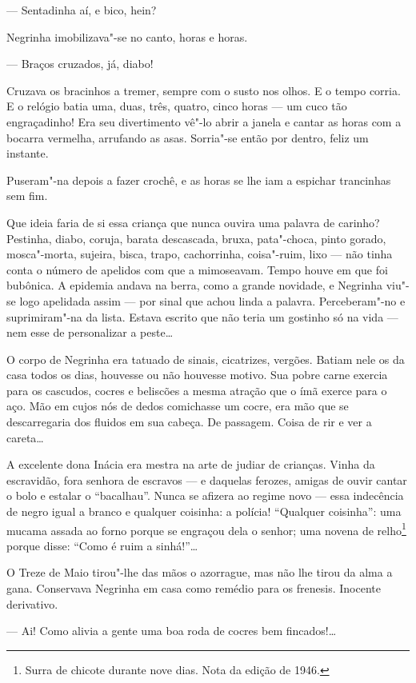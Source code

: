 --- Sentadinha aí, e bico, hein?

Negrinha imobilizava"-se no canto, horas e horas.

--- Braços cruzados, já, diabo!

Cruzava os bracinhos a tremer, sempre com o susto nos olhos. E o tempo
corria. E o relógio batia uma, duas, três, quatro, cinco horas --- um
cuco tão engraçadinho! Era seu divertimento vê"-lo abrir a janela e
cantar as horas com a bocarra vermelha, arrufando as asas. Sorria"-se
então por dentro, feliz um instante.

Puseram"-na depois a fazer crochê, e as horas se lhe iam a espichar
trancinhas sem fim.

Que ideia faria de si essa criança que nunca ouvira uma palavra de
carinho? Pestinha, diabo, coruja, barata descascada, bruxa, pata"-choca,
pinto gorado, mosca"-morta, sujeira, bisca, trapo, cachorrinha,
coisa"-ruim, lixo --- não tinha conta o número de apelidos com que a
mimoseavam. Tempo houve em que foi bubônica. A epidemia andava na berra,
como a grande novidade, e Negrinha viu"-se logo apelidada assim --- por
sinal que achou linda a palavra. Perceberam"-no e suprimiram"-na da lista.
Estava escrito que não teria um gostinho só na vida --- nem esse de
personalizar a peste\ldots{}

O corpo de Negrinha era tatuado de sinais, cicatrizes, vergões. Batiam
nele os da casa todos os dias, houvesse ou não houvesse motivo. Sua
pobre carne exercia para os cascudos, cocres e beliscões a mesma atração
que o ímã exerce para o aço. Mão em cujos nós de dedos comichasse um
cocre, era mão que se descarregaria dos fluidos em sua cabeça. De
passagem. Coisa de rir e ver a careta\ldots{}

A excelente dona Inácia era mestra na arte de judiar de crianças. Vinha
da escravidão, fora senhora de escravos --- e daquelas ferozes, amigas
de ouvir cantar o bolo e estalar o ``bacalhau''. Nunca se afizera ao
regime novo --- essa indecência de negro igual a branco e qualquer
coisinha: a polícia! ``Qualquer coisinha'': uma mucama assada ao forno
porque se engraçou dela o senhor; uma novena de relho\footnote{Surra de
  chicote durante nove dias. Nota da edição de 1946.} porque disse:
``Como é ruim a sinhá!''\ldots{}

O Treze de Maio tirou"-lhe das mãos o azorrague, mas não lhe tirou da
alma a gana. Conservava Negrinha em casa como remédio para os frenesis.
Inocente derivativo.

--- Ai! Como alivia a gente uma boa roda de cocres bem fincados!\ldots{}

